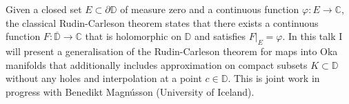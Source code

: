 {%
    Given a closed set $E \subset \partial {\mathbb D}$ of measure
    zero and a continuous function $\varphi: E \to {\mathbb C}$, the
    classical Rudin-Carleson theorem states that there exists a
    continuous function $F : \overline {\mathbb D} \to {\mathbb C}$
    that is holomorphic on ${\mathbb D}$ and satisfies
    $F|_E = \varphi$. In this talk I will present a
    generalisation of the Rudin-Carleson theorem for maps into Oka
    manifolds that additionally includes approximation on compact
    subsets $K \subset {\mathbb D}$ without any holes and
    interpolation at a point $c \in {\mathbb D}$. This is joint work
    in progress with Benedikt Magnússon (University of Iceland).
}
